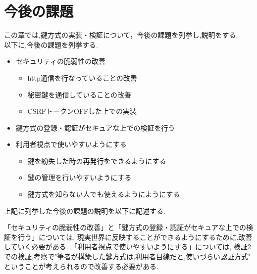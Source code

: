 \chapter{今後の課題}

この章では,鍵方式の実装・検証について，今後の課題を列挙し,説明をする.\\
以下に,今後の課題を列挙する.
\begin{itemize}
    \item セキュリティの脆弱性の改善
    \begin{itemize}
        \item http通信を行なっていることの改善
        \item 秘密鍵を通信していることの改善
        \item CSRFトークンOFF\cite{CSRF-token}した上での実装
    \end{itemize}
    \item 鍵方式の登録・認証がセキュアな上での検証を行う
    \item 利用者視点で使いやすいようにする
        \begin{itemize} 
            \item 鍵を紛失した時の再発行をできるようにする
            \item 鍵の管理を行いやすいようにする
            \item 鍵方式を知らない人でも使えるようにようにする
    \end{itemize}

\end{itemize}
上記に列挙した今後の課題の説明を以下に記述する.

「セキュリティの脆弱性の改善」と「鍵方式の登録・認証がセキュアな上での検証を行う」については,
現実世界に反映することができるようにするために,改善していく必要がある.
「利用者視点で使いやすいようにする」については,
検証2での検証,考察で"筆者が構築した鍵方式は,利用者目線だと,使いづらい認証方式"
ということが考えられるので改善する必要がある.
